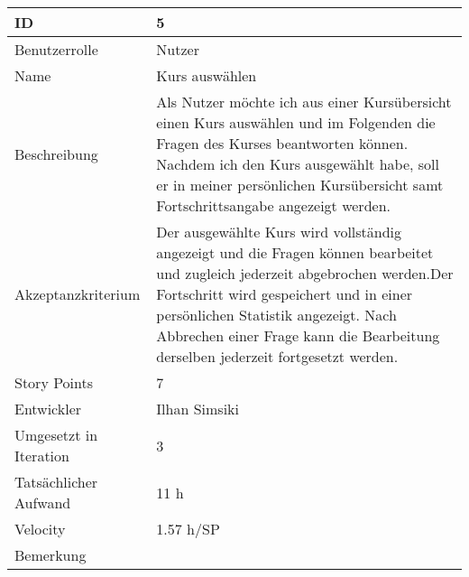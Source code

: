 \begin{tabularx}{\textwidth}{|p{}|X|}
	\hline
	ID & 5\\
	\hline
	Benutzerrolle & Nutzer\\
	\hline
	Name & Kurs auswählen\\
	\hline
	Beschreibung & Als Nutzer möchte ich aus einer Kursübersicht einen Kurs auswählen und im Folgenden die Fragen des Kurses beantworten können. Nachdem ich den Kurs ausgewählt habe, soll er in meiner persönlichen Kursübersicht samt Fortschrittsangabe angezeigt werden.\\
	\hline
	Akzeptanzkriterium & Der ausgewählte Kurs wird vollständig angezeigt und die Fragen können bearbeitet und zugleich jederzeit abgebrochen werden.Der Fortschritt wird gespeichert und in einer persönlichen Statistik angezeigt. Nach Abbrechen einer Frage kann die Bearbeitung derselben jederzeit fortgesetzt werden.\\
	\hline
	Story Points & 7\\
	\hline
	Entwickler & Ilhan Simsiki\\
	\hline
	Umgesetzt in Iteration & 3\\
	\hline
	Tatsächlicher Aufwand & 11 h\\
	\hline
	Velocity & 1.57 h/SP\\
	\hline
	Bemerkung & \\
	\hline
\end{tabularx}
\vspace{20pt}
